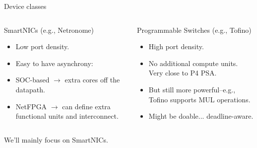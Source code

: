 \documentclass[aspectratio=169,xcolor={dvipsnames}
]{beamer}
\begin{document}
\begin{frame}{Device classes}
	\begin{columns}
		\begin{column}{0.5\linewidth}
			\alert{SmartNICs (e.g., Netronome)}
			
			\begin{itemize}[<+->]
				\item Low port density.
				\item Easy to have asynchrony:
				\item SOC-based $\rightarrow$ extra cores off the datapath.
				\item NetFPGA $\rightarrow$ can define extra functional units and interconnect.
			\end{itemize}
		\end{column}
		\begin{column}{0.5\linewidth}
			\alert{Programmable Switches (e.g., Tofino)}
			
			\begin{itemize}[<+->]
				\item High port density.
				\item No additional compute units. Very close to P4 PSA.
				\item But still more powerful--e.g., Tofino supports MUL operations.
				\item Might be doable... deadline-aware.
			\end{itemize}
		\end{column}
	\end{columns}

	\pause
	\vspace{1em}
	We'll mainly focus on SmartNICs.
\end{frame}
\end{document}
